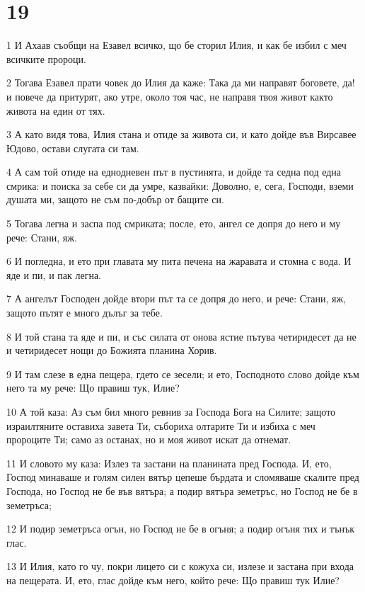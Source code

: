 \chapter{19}

\par 1 И Ахаав съобщи на Езавел всичко, що бе сторил Илия, и как бе избил с меч всичките пророци.
\par 2 Тогава Езавел прати човек до Илия да каже: Така да ми направят боговете, да! и повече да притурят, ако утре, около тоя час, не направя твоя живот както живота на един от тях.
\par 3 А като видя това, Илия стана и отиде за живота си, и като дойде във Вирсавее Юдово, остави слугата си там.
\par 4 А сам той отиде на еднодневен път в пустинята, и дойде та седна под една смрика: и поиска за себе си да умре, казвайки: Доволно, е, сега, Господи, вземи душата ми, защото не съм по-добър от бащите си.
\par 5 Тогава легна и заспа под смриката; после, ето, ангел се допря до него и му рече: Стани, яж.
\par 6 И погледна, и ето при главата му пита печена на жаравата и стомна с вода. И яде и пи, и пак легна.
\par 7 А ангелът Господен дойде втори път та се допря до него, и рече: Стани, яж, защото пътят е много дълъг за тебе.
\par 8 И той стана та яде и пи, и със силата от онова ястие пътува четиридесет да не и четиридесет нощи до Божията планина Хорив.
\par 9 И там слезе в една пещера, гдето се зесели; и ето, Господното слово дойде към него та му рече: Що правиш тук, Илие?
\par 10 А той каза: Аз съм бил много ревнив за Господа Бога на Силите; защото израилтяните оставиха завета Ти, събориха олтарите Ти и избиха с меч пророците Ти; само аз останах, но и моя живот искат да отнемат.
\par 11 И словото му каза: Излез та застани на планината пред Господа. И, ето, Господ минаваше и голям силен вятър цепеше бърдата и сломяваше скалите пред Господа, но Господ не бе във вятъра; а подир вятъра земетръс, но Господ не бе в земетръса;
\par 12 И подир земетръса огън, но Господ не бе в огъня; а подир огъня тих и тънък глас.
\par 13 И Илия, като го чу, покри лицето си с кожуха си, излезе и застана при входа на пещерата. И, ето, глас дойде към него, който рече: Що правиш тук Илие?
